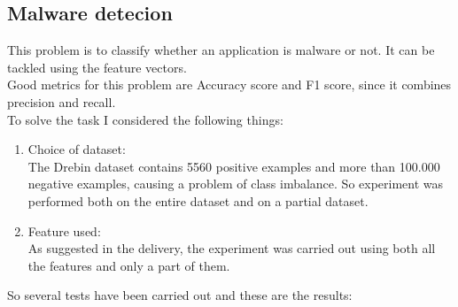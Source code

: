 \documentclass[11pt]{article}
\begin{document}
\subsection{Malware detecion}
This problem is to classify whether an application is malware or not. It can be tackled using the  feature vectors. \\
Good metrics for this problem are Accuracy score and F1 score, since it combines precision and
recall.\\
To solve the task I considered the following things:\\
\begin{enumerate}
	\item Choice of dataset: \\ The Drebin dataset contains 5560 positive examples and more than 100.000
negative examples, causing a problem of class imbalance. So experiment was performed both on the entire dataset and on a partial dataset.
	\item Feature used: \\ As suggested in the delivery, the experiment was carried out using both all the features and only a part of them.
\end{enumerate}
So several tests have been carried out and these are the results:
\end{document}

